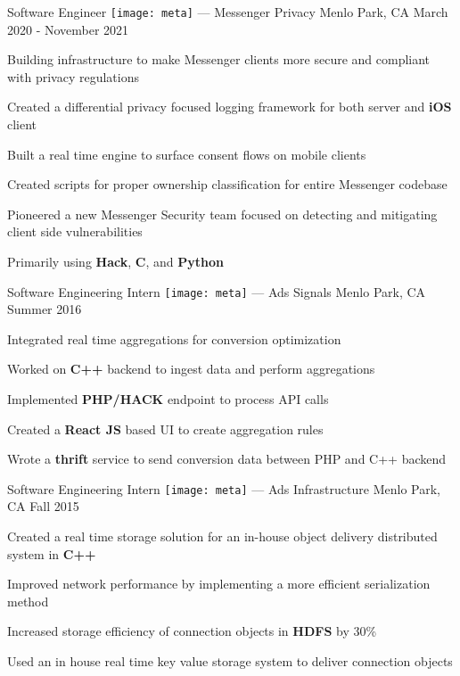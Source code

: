 \begin{cventries}

\cventry
{Software Engineer} %
{{\texttt{[image: meta]}} --- Messenger Privacy} %
{Menlo Park, CA} %
{March 2020 - November 2021} %
{ %
\begin{cvitems}
\item {Building infrastructure to make Messenger clients more secure and compliant with privacy regulations}
\item {Created a differential privacy focused logging framework for both server and \textbf{iOS} client}
\item {Built a real time engine to surface consent flows on mobile clients}
\item {Created scripts for proper ownership classification for entire Messenger codebase}
\item {Pioneered a new Messenger Security team focused on detecting and mitigating client side vulnerabilities}
\item {Primarily using \textbf{Hack}, \textbf{C}, and \textbf{Python}}
\end{cvitems}
}


\cventry
{Software Engineering Intern} %
{{\texttt{[image: meta]}} --- Ads Signals} %
{Menlo Park, CA} %
{Summer 2016} %
{ %
\begin{cvitems}
\item {Integrated real time aggregations for conversion optimization}
\item {Worked on \textbf{C++} backend to ingest data and perform aggregations}
\item {Implemented \textbf{PHP/HACK} endpoint to process API calls}
\item {Created a \textbf{React JS} based UI to create aggregation rules}
\item {Wrote a \textbf{thrift} service to send conversion data between PHP and C++ backend}
\end{cvitems}
}


\cventry
{Software Engineering Intern} %
{{\texttt{[image: meta]}} --- Ads Infrastructure} %
{Menlo Park, CA} %
{Fall 2015} %
{ %
\begin{cvitems}
\item {Created a real time storage solution for an in-house object delivery distributed system in \textbf{C++}}
\item {Improved network performance by implementing a more efficient serialization method}
\item {Increased storage efficiency of connection objects in \textbf{HDFS} by 30\%}
\item {Used an in house real time key value storage system to deliver connection objects}
\end{cvitems}
}


\end{cventries}
